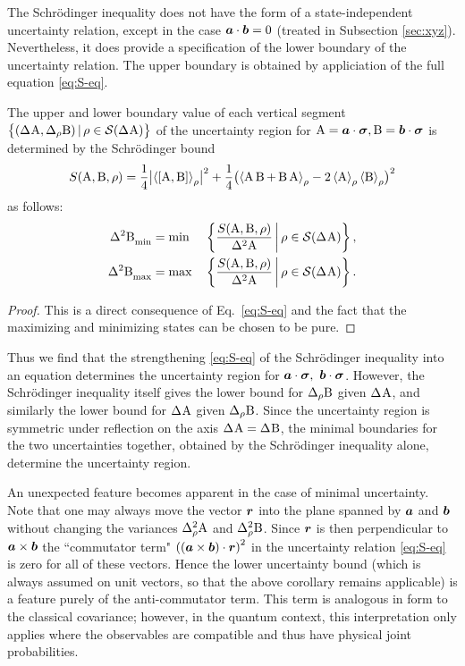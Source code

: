 The Schr\"odinger inequality does not have the form of a  state-independent uncertainty relation, except in the case $\bm{a}\cdot\bm{b}=0$ (treated in Subsection \ref{sec:xyz}).
Nevertheless, it does provide a specification of the lower boundary of the uncertainty relation. The upper boundary is obtained  by appliciation of the full equation \eqref{eq:S-eq}.
\begin{cor}
  The upper and lower boundary value of each vertical segment  $\bigl\{(\sdev{\opa},\sdevr{\opb})\,|\, \rho\in\si(\sdev{\opa})\bigr\}$ of the uncertainty region for $\operatorname{A}=\bm{a}\cdot{\boldsymbol\sigma},\operatorname{B}=\bm{b}\cdot{\boldsymbol\sigma}$ is determined by the Schr\"odinger bound
  \begin{equation}
    S(\operatorname{A},\operatorname{B},\rho)=\frac14 \bigl|\left\langle {\left[\operatorname{A},\operatorname{B}\right]}\right\rangle_\rho\bigr|^2+\frac14 \bigl(\left\langle {\operatorname{A}\operatorname{B}+ \operatorname{B}\operatorname{A}}\right\rangle_\rho-2\left\langle {\operatorname{A}}\right\rangle_\rho\left\langle {\operatorname{B}}\right\rangle_\rho\bigr)^2
  \end{equation}
  as follows: 
  \begin{alignat}{2} %
    \varmin{\opb}&=\min&&\left\{\frac{S(\opa,\opb,\rho)}{\var{\opa}}\,\middle|\,\rho\in\si(\sdev{\opa})\right\},\\
    \varmax{\opb}&=\max&&\left\{\frac{S(\opa,\opb,\rho)}{\var{\opa}}\,\middle|\,\rho\in\si(\sdev{\opa})\right\}.
  \end{alignat}
\end{cor}
\begin{proof}
  This is a direct consequence of Eq.~\eqref{eq:S-eq} and the fact that the maximizing and minimizing states can be chosen to be pure.
\end{proof}
Thus we find that the strengthening \eqref{eq:S-eq} of the Schr\"odinger inequality into an equation determines the uncertainty region for $\bm{a}\cdot{\boldsymbol\sigma},\ \bm{b}\cdot{\boldsymbol\sigma}$. However, the Schr\"odinger inequality itself gives the lower bound for $\sdevr{\opb}$ given $\sdev{\opa}$, and similarly the lower bound for $\sdev{\opa}$ given $\sdevr{\opb}$. Since the uncertainty region is symmetric under reflection on the axis $\sdev{\opa}=\sdev{\opb}$, the minimal boundaries for the two uncertainties together, obtained by the Schr\"odinger inequality alone, determine the uncertainty region.

An unexpected feature becomes apparent in the case of minimal uncertainty. Note that one may always move the vector $\bm{r}$ into the plane spanned by $\bm{a}$ and $\bm{b}$ without changing the variances $\varr{\opa}$ and $\varr{\opb}$. Since $\bm{r}$ is then perpendicular to $\bm{a}\times\bm{b}$ the ``commutator term" $\left(\left(\bm{a}\times\bm{b}\right)\cdot\bm{r}\right)^2$ in the uncertainty relation \eqref{eq:S-eq} is zero for all of these vectors. Hence the lower uncertainty bound (which is always assumed on unit vectors, so that the above corollary remains applicable) is a feature purely of the anti-commutator term. 
This term is analogous in form to the classical covariance; however, in the quantum context, this interpretation only applies where the observables are compatible and thus have physical joint probabilities.

